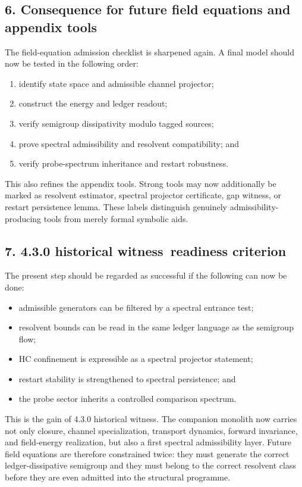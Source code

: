 \documentclass[12pt,a4paper]{article}
\newcommand{\docversion}{4.3.0 historical witness}
\begin{document}
\subsection*{6. Consequence for future field equations and appendix tools}
The field-equation admission checklist is sharpened again. A final model should
now be tested in the following order:
\begin{enumerate}[label=(\arabic*)]
 \item identify state space and admissible channel projector;
 \item construct the energy and ledger readout;
 \item verify semigroup dissipativity modulo tagged sources;
 \item prove spectral admissibility and resolvent compatibility; and
 \item verify probe-spectrum inheritance and restart robustness.
\end{enumerate}
This also refines the appendix tools. Strong tools may now additionally be marked as
resolvent estimator, spectral projector certificate, gap witness, or restart
persistence lemma. These labels distinguish genuinely admissibility-producing tools
from merely formal symbolic aids.

\subsection*{7. \docversion\ readiness criterion}
The present step should be regarded as successful if the following can now be done:
\begin{itemize}
 \item admissible generators can be filtered by a spectral entrance test;
 \item resolvent bounds can be read in the same ledger language as the semigroup flow;
 \item HC confinement is expressible as a spectral projector statement;
 \item restart stability is strengthened to spectral persistence; and
 \item the probe sector inherits a controlled comparison spectrum.
\end{itemize}

This is the gain of \docversion. The companion monolith now carries not only
closure, channel specialization, transport dynamics, forward invariance, and
field-energy realization, but also a first spectral admissibility layer. Future
field equations are therefore constrained twice: they must generate the correct
ledger-dissipative semigroup and they must belong to the correct resolvent class
before they are even admitted into the structural programme.
\end{document}
